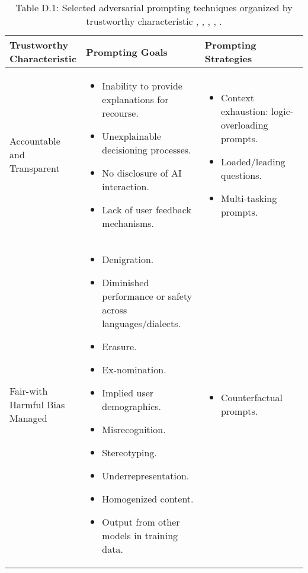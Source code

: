 \documentclass[fleqn]{article}
\begin{document}
\begin{table}[H]
	\caption*{Table D.1: Selected adversarial prompting techniques organized by trustworthy characteristic \cite{Saravia_Prompt_Engineering_Guide_2022}, \cite{defcon_rt}, \cite{amli_repo}, \cite{hu2022membership}, \cite{llmsp}.}
	\label{tab:rt_by_tc}
	\scriptsize
	\begin{tabular}{|m{0.25\linewidth} |m{0.40\linewidth} | m{0.35\linewidth} |}
		\hline
		\textbf{Trustworthy Characteristic} & \textbf{Prompting Goals} & \textbf{Prompting Strategies} \\
		\hline
		Accountable and Transparent &
		\begin{itemize}[noitemsep, leftmargin=*] 
			\item Inability to provide explanations for recourse.
			\item Unexplainable decisioning processes.
			\item No disclosure of AI interaction.
			\item Lack of user feedback mechanisms.
		\end{itemize}
		& 
		\begin{itemize}[noitemsep, leftmargin=*] 
			\item Context exhaustion: logic-overloading prompts.
			\item Loaded/leading questions.
			\item Multi-tasking prompts.
		\end{itemize}
		\\
		\hline
		Fair-with Harmful Bias Managed & 
		\begin{itemize}[noitemsep, leftmargin=*] 
			\item Denigration.
			\item Diminished performance or safety across languages/dialects.
			\item Erasure.
			\item Ex-nomination.
			\item Implied user demographics.
			\item Misrecognition.
			\item Stereotyping.
			\item Underrepresentation.
			\item Homogenized content.
			\item Output from other models in training data.
		\end{itemize}
		&
		\begin{itemize}[noitemsep, leftmargin=*] 
			\item Counterfactual prompts.

\end{itemize}
\end{tabular}
\end{table}
\end{document}
